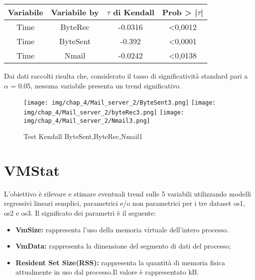 \begin{table}[htbp]
    \centering
    \label{tab:esempio}
    \begin{tabular}{|c|c|c|c|} %
        \hline
        Variabile & Variabile by & $\tau$ di Kendall &Prob > |$\tau$| \\ %
        \hline
        Time & ByteRec & -0.0316 & <0,0012\\
        Time & ByteSent & -0.392 & <0,0001\\
        Time & Nmail & -0.0242 & <0,0138\\
        \hline
    \end{tabular}
\end{table}
\noindent
Dai dati raccolti risulta che, considerato il tasso di significatività standard
pari a $\alpha$ = 0.05, nessuna variabile presenta un trend significativo.

\begin{figure}[H]
    \centering
    \texttt{[image: img/chap\_4/Mail\_server\_2/ByteSent3.png]}
    \texttt{[image: img/chap\_4/Mail\_server\_2/byteRec3.png]}
    \texttt{[image: img/chap\_4/Mail\_server\_2/Nmail3.png]}
    \caption{Test Kendall ByteSent,ByteRec,Nmail1}
    \label{fig:sis_2_25_k}
\end{figure}
\noindent

\section{VMStat}
L’obiettivo è rilevare e stimare eventuali trend sulle 5 variabili utilizzando modelli regressivi lineari semplici, parametrici e/o non parametrici per i tre dataset os1, os2 e os3.
Il significato dei parametri è il seguente:
\begin{itemize}
    \item \textbf{VmSize: }rappresenta l’uso della memoria virtuale dell’intero processo.
    \item \textbf{VmData: }rappresenta la dimensione del segmento di dati del processo;
    \item \textbf{Resident Set Size(RSS): }rappresenta la quantità di memoria fisica attualmente in uso dal processo.Il valore è rappresentato kB.
\end{itemize}

